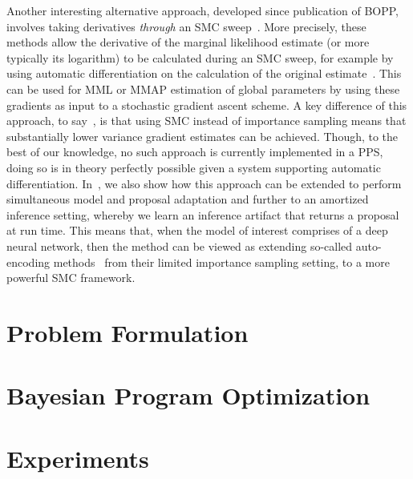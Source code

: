 Another interesting alternative approach,
developed since publication of BOPP, involves taking derivatives \emph{through} an SMC
sweep~\citep{le2017auto,naesseth2017variational,maddison2017filtering}. 
More precisely, these methods allow the derivative of the marginal likelihood estimate (or more typically
its logarithm) to be calculated during an SMC sweep, for example by using automatic differentiation
on the calculation of the original estimate~\citep{le2017auto}.  This can be used for MML or MMAP estimation
of global parameters by using these gradients as input to a stochastic gradient ascent scheme.
A key difference of this approach, to say~\cite{vandemeent2016black}, is that using SMC instead of importance
sampling means that substantially lower variance gradient estimates can be achieved.
Though, to the best of our knowledge, no such approach is currently implemented in a PPS, doing so is 
in theory perfectly possible given a system supporting automatic differentiation.  
In~\cite{le2017auto}, we also show how this approach can be extended to perform simultaneous model
and proposal adaptation and further to an amortized inference setting, whereby we learn an inference
artifact that returns a proposal at run time.  This means that, when the model of interest comprises of
a deep neural network, then the method can be viewed as extending so-called auto-encoding methods~\citep{kingma2014auto,burda2015importance}
from their limited importance sampling setting, to a more powerful SMC framework.

\section{Problem Formulation}
\label{sec:problem}



\section{Bayesian Program Optimization}
\label{sec:bopp}


%
%
%

\section{Experiments}
\label{sec:bopp:exp}

